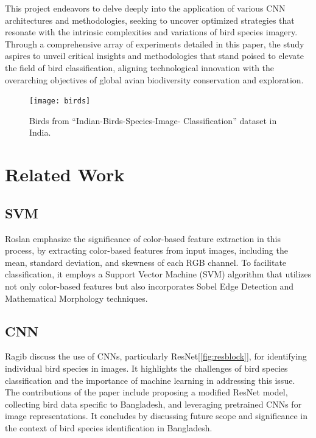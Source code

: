 \documentclass[10pt,twocolumn,letterpaper]{article}
\begin{document}
This project endeavors to delve deeply into the application of various CNN architectures and methodologies, seeking to uncover optimized strategies that resonate with the intrinsic complexities and variations of bird species imagery. Through a comprehensive array of experiments detailed in this paper, the study aspires to unveil critical insights and methodologies that stand poised to elevate the field of bird classification, aligning technological innovation with the overarching objectives of global avian biodiversity conservation and exploration.\begin{figure}[t]
	\centering
	\texttt{[image: birds]}
	\caption{Birds from ``Indian-Birds-Species-Image-
	Classification'' dataset in India.}
	\label{fig:birds}
\end{figure}

\section{Related Work}
\label{sec:related}
\subsection{SVM}
Roslan \etal\cite{roslan2017color} emphasize the significance of color-based feature extraction in this process, by extracting color-based features from input images, including the mean, standard deviation, and skewness of each RGB channel. To facilitate classification, it employs a Support Vector Machine (SVM)\cite{suthaharan2016support} algorithm that utilizes not only color-based features but also incorporates Sobel Edge Detection and Mathematical Morphology techniques.
\subsection{CNN}
Ragib \etal\cite{ragib2020pakhichini} discuss the use of CNNs, particularly ResNet\cite{he2016deep}[\ref{fig:resblock}], for identifying individual bird species in images. It highlights the challenges of bird species classification and the importance of machine learning in addressing this issue. The contributions of the paper include proposing a modified ResNet model, collecting bird data specific to Bangladesh, and leveraging pretrained CNNs for image representations. It concludes by discussing future scope and significance in the context of bird species identification in Bangladesh.
\end{document}
